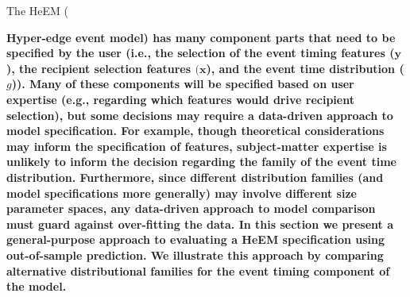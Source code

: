 \documentclass[12pt]{article}
\begin{document}
The HeEM ({\bf Hyper-edge event model)	has many component parts that need to be specified by the user (i.e., the selection of the event timing features ($\bm{y}$), the recipient selection features $(\bm{x}$), and the event time distribution ($g$)). Many of these components will be specified based on user expertise (e.g., regarding which features would drive recipient selection), but some decisions may require a data-driven approach to model specification. For example, though theoretical considerations may inform the specification of features, subject-matter expertise is unlikely to inform the decision regarding the family of the event time distribution. Furthermore, since different distribution families (and model specifications more generally) may involve different size parameter spaces, any data-driven approach to model comparison must guard against over-fitting the data. In this section we present a general-purpose approach to evaluating a HeEM specification using out-of-sample prediction. We illustrate this approach by comparing alternative distributional families for the event timing component of the model.
	
}
\end{document}
